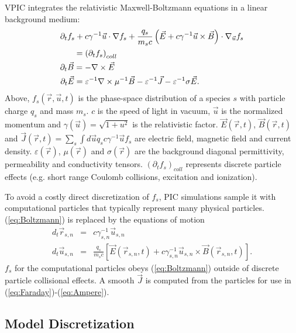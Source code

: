 \documentclass[journal,twoside]{IEEEtran}
\newcommand{\eps}{\varepsilon}
\newcommand{\vecr}{\vec{r}}
\newcommand{\vecu}{\vec{u}}
\newcommand{\vecJ}{\vec{J}}
\newcommand{\vecE}{\vec{E}}
\newcommand{\vecB}{\vec{B}}
\newcommand{\Deriv}[2]{d_{#2}#1}
\newcommand{\PDeriv}[2]{\partial_{#2}#1}
\newcommand{\DotP}[2]{#1 \cdot #2}
\newcommand{\CrossP}[2]{#1 \times #2}
\newcommand{\Grad}[1]{\nabla #1}
\newcommand{\Curl}[1]{\nabla \times #1}
\newcommand{\Gradu}[1]{\nabla_{\vecu} #1}
\newcommand{\eq}[1]{(\ref{eq:#1})}
\begin{document}
VPIC integrates the relativistic Maxwell-Boltzmann equations in a
linear background medium:
\begin{eqnarray}
\PDeriv{f_s}{t} + 
\DotP{c\gamma^{-1}\vecu}{\Grad{f_s}} +
\DotP{\frac{q_s}{m_s c}\left(\vecE+\CrossP{c\gamma^{-1}\vecu}{\vecB}\right)}
{\Gradu{f_s}}\nonumber&\\
= \left(\PDeriv{f_s}{t}\right)_{coll}\label{eq:Boltzmann}
\hspace{2.14in}&\\
\PDeriv{\vecB}{t} = -\Curl{\vecE} \label{eq:Faraday}
\hspace{2.18in}&\\
\PDeriv{\vecE}{t} =
\eps^{-1}\Curl{\mu^{-1}\vecB} - \eps^{-1}\vecJ - \eps^{-1}\sigma\vecE.
\label{eq:Ampere}
\hspace{0.75in}&
\end{eqnarray}
Above, $f_s\left(\vecr,\vecu,t\right)$ is the phase-space distribution
of a species $s$ with particle charge $q_s$ and mass $m_s$.  $c$ is
the speed of light in vacuum, $\vecu$ is the normalized momentum and
$\gamma\left(\vecu\right) = \sqrt{1 + u^2}$ is the relativistic
factor.  $\vecE\left(\vecr,t\right)$, $\vecB\left(\vecr,t\right)$ and
$\vecJ\left(\vecr,t\right) = \sum_s \int d\vecu q_s c\gamma^{-1}\vecu
f_s$ are electric field, magnetic field and current density.
$\eps\left(\vecr\right)$, $\mu\left(\vecr\right)$ and
$\sigma\left(\vecr\right)$ are the background diagonal permittivity,
permeability and conductivity tensors.
$\left(\PDeriv{f_s}{t}\right)_{coll}$ represents discrete particle
effects (e.g. short range Coulomb collisions, excitation and
ionization).

To avoid a costly direct discretization of $f_s$, PIC simulations
sample it with computational particles that typically represent many
physical particles.  \eq{Boltzmann} is replaced by the equations of
motion
\begin{eqnarray}
\Deriv{\vecr_{s,n}}{t} &=& c \gamma_{s,n}^{-1} \vecu_{s,n} \label{eq:Position}\\
\Deriv{\vecu_{s,n}}{t} &=& \frac{q_s}{m_s c} \left[
\vecE\left(\vecr_{s,n},t\right) +
\CrossP{c\gamma_{s,n}^{-1}\vecu_{s,n}}{\vecB\left(\vecr_{s,n},t\right)}
\right] \label{eq:Momentum}
.
\end{eqnarray}
$f_s$ for the computational particles obeys \eq{Boltzmann} outside of
discrete particle collisional effects.  A smooth $\vecJ$ is computed
from the particles for use in \eq{Faraday}-\eq{Ampere}.

\subsection{Model Discretization}
\end{document}
